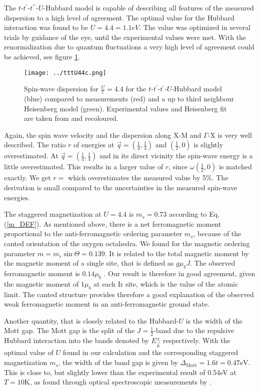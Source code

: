 The $t$-$t^{\prime}$-$t^{\prime \prime}$-$U$-Hubbard model
is capable of describing all features of the measured dispersion to a high level of agreement. 
The optimal value for the Hubbard interaction was found to be $U=4.4=1.1eV$.
The value was optimized in several trials by guidance of the eye, until the experimental values were met.
With the renormalization due to quantum fluctuations a very high level of agreement could be achieved, see figure \ref{tttU42}.
%
\begin{figure}
 \begin{center}
  \texttt{[image: ../tttU44c.png]}
 \caption{ Spin-wave dispersion for $\frac Ut=4.4$ for the $t$-$t^{\prime}$-$t^{\prime}$-$U$-Hubbard model (blue) 
 compared to measurements (red) and a up to third neighbour Heisenberg model (green). 
 Experimental values and Heisenberg fit are taken from \cite{PhysRevLett.108.177003} and recoloured.} 
\label{tttU42}
 \end{center}
\end{figure}
%
Again, the spin wave velocity and the dispersion along X-M and $\Gamma$-X is very well described. 
The ratio $r$ of energies at $\vec q = (\frac14,\frac14)$ and $(\frac12,0)$ is slightly overestimated.
At $\vec q = (\frac14,\frac14)$ and in its direct vicinity the spin-wave energy is a little overestimated.
This results in a larger value of $r$, since $\omega(\frac12,0)$ is matched exactly.
We get $r=$ which overestimates the measured value by 5\%.
The derivation is small compared  to the uncertainties in the measured spin-wave energies. 



The staggered magnetization at $U=4.4$ is $m_s= 0.73$ according to Eq. (\ref{m_DEF}).
As mentioned above, there is a net ferromagnetic moment proportional to the anti-ferromagnetic ordering 
parameter $m_s$, because of the canted orientation of the oxygen octahedra. 
We found for the magnetic ordering parameter $m = m_s \sin \Theta = 0.139$. 
It is related to the total magnetic moment by the magnetic moment of a single site, that is defined as $g\mu_b J$.
The observed ferromagnetic moment is $0.14\mu_b$ \cite{PhysRevB.57.R11039}. 
Our result is therefore in good agreement, given the magnetic moment of $1\mu_b$ at each Ir site, which is the value of the atomic limit.
The canted structure provides therefore a good explanation of the observed weak ferromagnetic moment 
in an anti-ferromagnetic ground state.

Another quantity, that is closely related to the Hubbard-$U$ is the width of the Mott gap.
The Mott gap is the split of the $J=\frac12$-band due to the repulsive Hubbard interaction into the bands denoted by $E^{\pm}_{\vec k}$ respectively. 
With the optimal value of $U$ found in  our calculation and the corresponding staggered magnetization $m_s$, 
the width of the band gap is given by $\Delta_{\mathrm{Mott}}=1.6t=0.47\mathrm{eV}$.
This is close to, but slightly lower than the experimental result of 0.54eV  at $T=10$K,
as found through optical spectroscopic measurements by \citet{PhysRevB.80.195110}.


